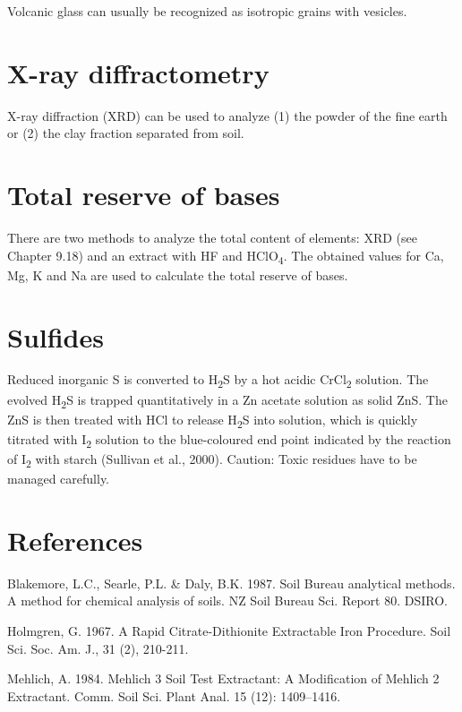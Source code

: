 \documentclass[
  letterpaper,
  DIV=11,
  numbers=noendperiod]{scrreprt}
\begin{document}
Volcanic glass can usually be recognized as isotropic grains with
vesicles.

\hypertarget{x-ray-diffractometry}{%
\section{X-ray diffractometry}\label{x-ray-diffractometry}}

X-ray diffraction (XRD) can be used to analyze (1) the powder of the
fine earth or (2) the clay fraction separated from soil.

\hypertarget{total-reserve-of-bases}{%
\section{Total reserve of bases}\label{total-reserve-of-bases}}

There are two methods to analyze the total content of elements: XRD (see
Chapter 9.18) and an extract with HF and HClO\textsubscript{4}. The
obtained values for Ca, Mg, K and Na are used to calculate the total
reserve of bases.

\hypertarget{sulfides}{%
\section{Sulfides}\label{sulfides}}

Reduced inorganic S is converted to H\textsubscript{2}S by a hot acidic
CrCl\textsubscript{2} solution. The evolved H\textsubscript{2}S is
trapped quantitatively in a Zn acetate solution as solid ZnS. The ZnS is
then treated with HCl to release H\textsubscript{2}S into solution,
which is quickly titrated with I\textsubscript{2} solution to the
blue-coloured end point indicated by the reaction of I\textsubscript{2}
with starch (Sullivan et al., 2000). Caution: Toxic residues have to be
managed carefully.

\hypertarget{references-2}{%
\section{References}\label{references-2}}

Blakemore, L.C., Searle, P.L. \& Daly, B.K. 1987. Soil Bureau analytical
methods. A method for chemical analysis of soils. NZ Soil Bureau Sci.
Report 80. DSIRO.

Holmgren, G. 1967. A Rapid Citrate-Dithionite Extractable Iron
Procedure. Soil Sci. Soc. Am. J., 31 (2), 210-211.

Mehlich, A. 1984. Mehlich 3 Soil Test Extractant: A Modification of
Mehlich 2 Extractant. Comm. Soil Sci. Plant Anal. 15 (12): 1409--1416.
\end{document}
